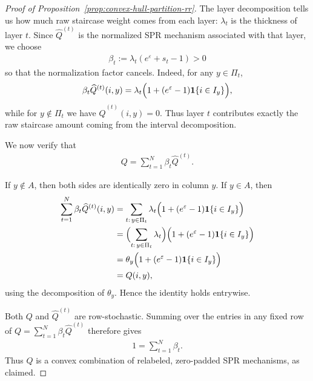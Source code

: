 \documentclass{article}
\theoremstyle{plain}
\theoremstyle{definition}
\theoremstyle{plain}
\newcommand{\eps}{\varepsilon}
\begin{document}
\begin{proof}[Proof of Proposition~\ref{prop:convex-hull-partition-rr}]
The layer decomposition tells us how much raw staircase weight comes from each layer: $\lambda_t$ is the thickness of layer $t$. Since $\widehat Q^{(t)}$ is the normalized SPR mechanism associated with that layer, we choose
\begin{align*}
    \beta_t:=\lambda_t(e^\eps+s_t-1)>0
\end{align*}
so that the normalization factor cancels. Indeed, for any $y\in \Pi_t$,
\begin{align*}
    \beta_t \widehat Q^{(t)}(i,y)
    = \lambda_t\Bigl(1+(e^\eps-1)\mathbf 1\{i\in I_y\}\Bigr),
\end{align*}
while for $y\notin \Pi_t$ we have $\widehat Q^{(t)}(i,y)=0$. Thus layer $t$ contributes exactly the raw staircase amount coming from the interval decomposition.

We now verify that
\begin{align*}
    Q=\sum_{t=1}^N \beta_t \widehat Q^{(t)}.
\end{align*}

If $y\notin A$, then both sides are identically zero in column $y$. If $y\in A$, then
\begin{align*}
\sum_{t=1}^N \beta_t \widehat Q^{(t)}(i,y)
&=
\sum_{t:\, y\in \Pi_t}
\lambda_t\Bigl(1+(e^\eps-1)\mathbf 1\{i\in I_y\}\Bigr)\\
&=
\Bigl(\sum_{t:\, y\in \Pi_t}\lambda_t\Bigr)
\Bigl(1+(e^\eps-1)\mathbf 1\{i\in I_y\}\Bigr)\\
&=
\theta_y\Bigl(1+(e^\eps-1)\mathbf 1\{i\in I_y\}\Bigr)\\
&=Q(i,y),
\end{align*}
using the decomposition of $\theta_y$. Hence the identity holds entrywise.

Both $Q$ and $\widehat Q^{(t)}$ are row-stochastic. Summing over the entries in any fixed row of $Q=\sum_{t=1}^N \beta_t \widehat Q^{(t)}$ therefore gives
\begin{align*}
    1=\sum_{t=1}^N \beta_t.
\end{align*}
Thus $Q$ is a convex combination of relabeled, zero-padded SPR mechanisms, as claimed.
\end{proof}
\end{document}
